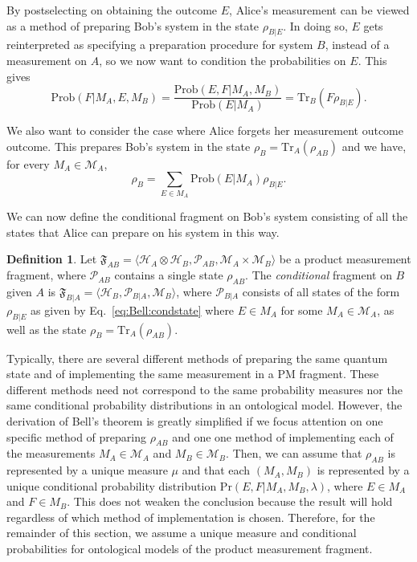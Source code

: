 \documentclass[DIV=calc,paper=a4,fontsize=11pt,twocolumn]{scrartcl} %
\theoremstyle{definition}
\newtheorem{definition}{Definition}[section]
\theoremstyle{plain}
\newcommand{\Hilb}[1][]{\ensuremath{\mathcal{H}_{#1}}}
\newcommand{\Tr}[2][]{\ensuremath{\text{Tr}_{#1} \left ( #2 \right )}}
\begin{document}
By postselecting on obtaining the outcome $E$, Alice's measurement can
be viewed as a method of preparing Bob's system in the state
$\rho_{B|E}$.  In doing so, $E$ gets reinterpreted as specifying a
preparation procedure for system $B$, instead of a measurement on $A$,
so we now want to condition the probabilities on $E$.  This gives
\begin{equation}
\text{Prob}(F|M_A,E,M_B) =
\frac{\text{Prob}(E,F|M_A,M_B)}{\text{Prob}(E|M_A)}
= \Tr[B]{F \rho_{B|E}}. \label{eq:Bell:cond}
\end{equation}

We also want to consider the case where Alice forgets her measurement
outcome outcome.  This prepares Bob's system in the state $\rho_B =
\Tr[A]{\rho_{AB}}$ and we have, for every $M_A \in \mathcal{M}_A$,
\begin{equation}
\rho_B = \sum_{E \in M_A} \text{Prob}(E|M_A) \rho_{B|E}.
\end{equation}

We can now define the conditional fragment on Bob's system consisting
of all the states that Alice can prepare on his system in this way.
\begin{definition}
Let $\mathfrak{F}_{AB} = \langle \Hilb[A] \otimes \Hilb[B],
\mathcal{P}_{AB}, \mathcal{M}_A \times \mathcal{M}_B \rangle$ be a
product measurement fragment, where $\mathcal{P}_{AB}$ contains a
single state $\rho_{AB}$.  The \emph{conditional} fragment on $B$
given $A$ is $\mathfrak{F}_{B|A} = \langle \Hilb[B],
\mathcal{P}_{B|A}, \mathcal{M}_B \rangle$, where $\mathcal{P}_{B|A}$
consists of all states of the form $\rho_{B|E}$ as given by
Eq.~\eqref{eq:Bell:condstate} where $E \in M_A$ for some $M_A \in
\mathcal{M}_A$, as well as the state $\rho_B = \Tr[A]{\rho_{AB}}$.
\end{definition}

Typically, there are several different methods of preparing the same
quantum state and of implementing the same measurement in a PM
fragment.  These different methods need not correspond to the same
probability measures nor the same conditional probability
distributions in an ontological model.  However, the derivation of
Bell's theorem is greatly simplified if we focus attention on one
specific method of preparing $\rho_{AB}$ and one one method of
implementing each of the measurements $M_A \in \mathcal{M}_A$ and $M_B
\in \mathcal{M}_B$.  Then, we can assume that $\rho_{AB}$ is
represented by a unique measure $\mu$ and that each $(M_A,M_B)$ is
represented by a unique conditional probability distribution
$\text{Pr}(E,F|M_A,M_B,\lambda)$, where $E \in M_A$ and $F \in M_B$.
This does not weaken the conclusion because the result will hold
regardless of which method of implementation is chosen.  Therefore,
for the remainder of this section, we assume a unique measure and
conditional probabilities for ontological models of the product
measurement fragment.
\end{document}
